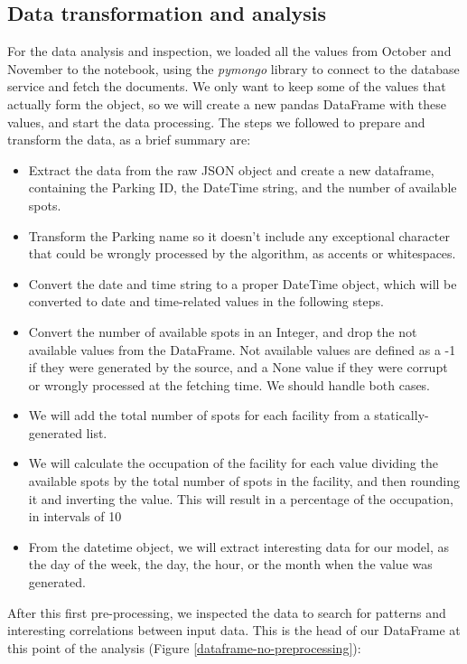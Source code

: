 \clearpage

\subsection{Data transformation and analysis}

For the data analysis and inspection, we loaded all the values from October and November to the notebook, using the \textit{pymongo}\cite{pymongo} library to connect to the database service and fetch the documents. We only want to keep some of the values that actually form the object, so we will create a new pandas DataFrame with these values, and start the data processing. The steps we followed to prepare and transform the data, as a brief summary are:

\begin{itemize}
    \item Extract the data from the raw JSON object and create a new dataframe, containing the Parking ID, the DateTime string, and the number of available spots.
    \item Transform the Parking name so it doesn’t include any exceptional character that could be wrongly processed by the algorithm, as accents or whitespaces.
    \item Convert the date and time string to a proper DateTime object, which will be converted to date and time-related values in the following steps.
    \item Convert the number of available spots in an Integer, and drop the not available values from the DataFrame. Not available values are defined as a -1 if they were generated by the source, and a None value if they were corrupt or wrongly processed at the fetching time. We should handle both cases.
    \item We will add the total number of spots for each facility from a statically-generated list.
    \item We will calculate the occupation of the facility for each value dividing the available spots by the total number of spots in the facility, and then rounding it and inverting the value. This will result in a percentage of the occupation, in intervals of 10%
    \item From the datetime object, we will extract interesting data for our model, as the day of the week, the day, the hour, or the month when the value was generated.
\end{itemize}

After this first pre-processing, we inspected the data to search for patterns and interesting correlations between input data. This is the head of our DataFrame at this point of the analysis (Figure \ref{dataframe-no-preprocessing}):

